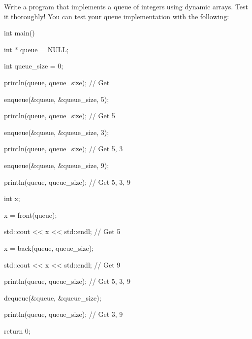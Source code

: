 Write a program that implements a queue of integers using dynamic arrays. Test it thoroughly! You can test your queue implementation with the following:



\begin{consolethree}[escapeinside=||]

int main()

{

    int * queue = NULL;

    int queue_size = 0;

    println(queue, queue_size); // Get {}

    enqueue(&queue, &queue_size, 5);

    println(queue, queue_size); // Get {5}

    enqueue(&queue, &queue_size, 3);

    println(queue, queue_size); // Get {5, 3}

    enqueue(&queue, &queue_size, 9);

    println(queue, queue_size); // Get {5, 3, 9}

    int x;

    x = front(queue);

    std::cout << x << std::endl; // Get 5

    x = back(queue, queue_size);

    std::cout << x << std::endl; // Get 9

    println(queue, queue_size); // Get {5, 3, 9}

    dequeue(&queue, &queue_size);

    println(queue, queue_size); // Get {3, 9}

    return 0;

}

\end{consolethree}

